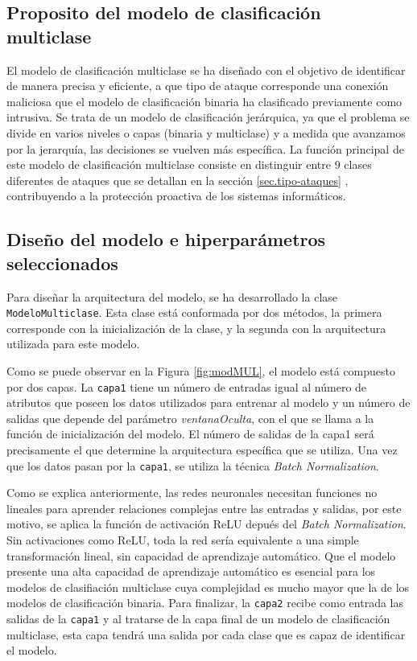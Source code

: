 \subsection{Proposito del modelo de clasificación multiclase}

El modelo de clasificación multiclase se ha diseñado con el objetivo de identificar de manera precisa y eficiente, a que tipo de ataque corresponde una conexión maliciosa que el modelo de clasificación binaria ha clasificado previamente como intrusiva. Se trata de un modelo  de clasificación jerárquica, ya que el problema se divide en varios niveles o capas (binaria y multiclase) y a medida que avanzamos por la jerarquía, las decisiones se vuelven más específica. La función principal de este modelo de clasificación multiclase consiste en distinguir entre 9 clases diferentes de ataques que se detallan en la sección \ref{sec.tipo-ataques} , contribuyendo a la protección proactiva de los sistemas informáticos.

\subsection{Diseño del modelo e hiperparámetros seleccionados} \label{sec:disMUL}
Para diseñar la arquitectura del modelo, se ha desarrollado la clase \texttt{ModeloMulticlase}. Esta clase está conformada por dos métodos, la primera corresponde con la inicialización de la clase, y la segunda con la arquitectura utilizada para este modelo.

Como se puede observar en la Figura \ref{fig:modMUL}, el modelo está compuesto por dos capas. La \texttt{capa1} tiene un número de entradas igual al número de atributos que poseen los datos utilizados para entrenar al modelo y un número de salidas que depende del parámetro \textit{ventanaOculta}, con el que se llama a la función de inicialización del modelo. El número de salidas de la capa1 será precisamente el que determine la arquitectura específica que se utiliza. Una vez que los datos pasan por la \texttt{capa1}, se utiliza la técnica \textit{Batch Normalization}. 

Como se explica anteriormente, las redes neuronales necesitan funciones no lineales para aprender relaciones complejas entre las entradas y salidas, por este motivo, se aplica la función de activación ReLU depués del \textit{Batch Normalization}. Sin activaciones como ReLU, toda la red sería equivalente a una simple transformación lineal, sin capacidad de aprendizaje automático. Que el modelo presente una alta capacidad de aprendizaje automático es esencial para los modelos de clasifiación multiclase cuya complejidad es mucho mayor que la de los modelos de clasificación binaria. Para finalizar, la \texttt{capa2} recibe como entrada las salidas de la \texttt{capa1} y al tratarse de la capa final de un modelo de clasificación multiclase, esta capa tendrá una salida por cada clase que es capaz de identificar el modelo.

